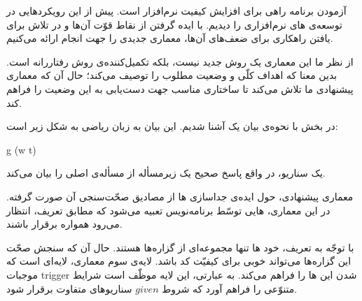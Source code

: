 آزمودن برنامه راهی برای افزایش کیفیت نرم‌افزار است. پیش از این رویکردهایی در توسعه‌ی های نرم‌افزاری را دیدیم. با ایده گرفتن از نقاط قوّت آن‌ها و در تلاش برای یافتن راهکاری برای ضعف‌های آن‌ها، معماری جدیدی را جهت انجام  ارائه می‌کنیم.

از نظر ما این معماری یک روش جدید نیست، بلکه تکمیل‌کننده‌ی روش رفتاررانه است. بدین معنا که  اهداف کلّی و وضعیت مطلوب را توصیف می‌کند؛ حال آن که معماری پیشنهادی ما تلاش می‌کند تا ساختاری مناسب جهت دست‌یابی به این وضعیت را فراهم کند.

در بخش  با نحوه‌ی بیان یک  آشنا شدیم. این بیان به زبان ریاضی به شکل زیر است:

g \implies (w \implies t)


یک سناریو، در واقع پاسخ صحیح یک زیرمسأله از مسأله‌ی اصلی را بیان می‌کند.

معماری پیشنهادی، حول ایده‌ی جداسازی ها از مصادیق صحّت‌سنجی آن صورت گرفته. در این معماری، هایی توسّط برنامه‌نویس تعبیه می‌شود که مطابق تعریف، انتظار می‌رود همواره برقرار باشند.

با توجّه به تعریف، خود ها تنها مجموعه‌ای از گزاره‌ها هستند. حال آن که سنجش صحّت این گزاره‌ها می‌تواند  خوبی برای کیفیّت کد باشد. لایه‌ی سوم معماری، لایه‌ای است که موجبات trigger شدن این ها را فراهم می‌کند. به عبارتی، این لایه موظّف است شرایط متنوّعی را فراهم آورد که شروط $given$ سناریوهای متفاوت برقرار شود.


